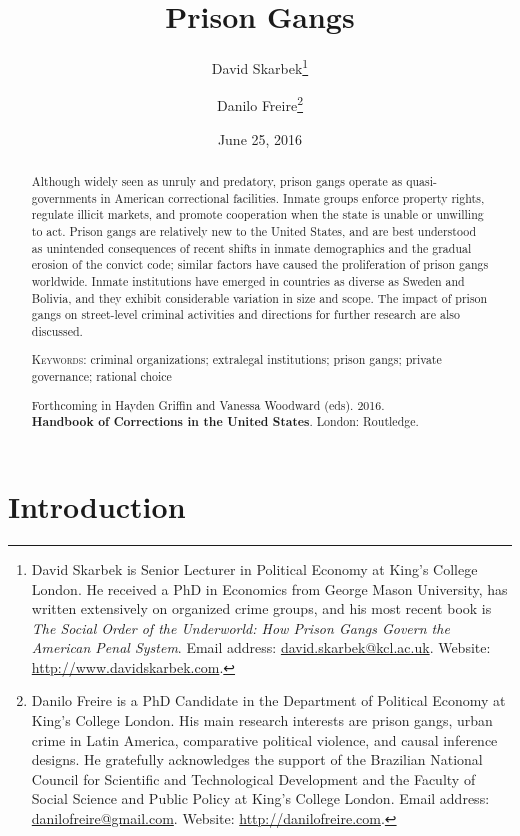 \documentclass[a4paper, 12pt]{article}
\title{Prison Gangs}
\author{
David Skarbek\thanks{David Skarbek is Senior Lecturer in Political Economy at King's College London. He received a PhD in Economics from George Mason University, has written extensively on organized crime groups, and his most recent book is \textit{The Social Order of the Underworld: How Prison Gangs Govern the American Penal System}. Email address: \href{mailto:david.skarbek@kcl.ac.uk}{david.skarbek@kcl.ac.uk}. Website: \href{http://www.davidskarbek.com/}{http://www.davidskarbek.com}. } 
\and 
Danilo Freire\thanks{Danilo Freire is a PhD Candidate in the Department of Political Economy at King's College London. His main research interests are prison gangs, urban crime in Latin America, comparative political violence, and causal inference designs. He gratefully acknowledges the support of the Brazilian National Council for Scientific and Technological Development and the Faculty of Social Science and Public Policy at King's College London. Email address: \href{mailto:danilofreire@gmail.com}{danilofreire@gmail.com}. Website: \href{http://danilofreire.com}{http://danilofreire.com}. } 
}
\date{June 25, 2016}
\begin{document}
\maketitle

\doublespacing

\begin{abstract}

\noindent Although widely seen as unruly and predatory, prison gangs operate as quasi-governments in American correctional facilities. Inmate groups enforce property rights, regulate illicit markets, and promote cooperation when the state is unable or unwilling to act. Prison gangs are relatively new to the United States, and are best understood as unintended consequences of recent shifts in inmate demographics and the gradual erosion of the convict code; similar factors have caused the proliferation of prison gangs worldwide. Inmate institutions have emerged in countries as diverse as Sweden and Bolivia, and they exhibit considerable variation in size and scope. The impact of prison gangs on street-level criminal activities and directions for further research are also discussed.

\vspace{.5cm}

\noindent \textsc{Keywords}: criminal organizations; extralegal institutions; prison gangs; private governance; rational choice \\

\vspace{.25cm} 

\begin{center}
\noindent Forthcoming in Hayden Griffin and Vanessa Woodward (eds). 2016.\\ \textbf{Handbook of Corrections in the United States}. London: Routledge. 
\end{center}


\end{abstract}

\newpage

\section{Introduction}
\label{sec:intro}
\end{document}
